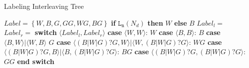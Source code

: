 \documentclass[runningheads]{llncs}
\newcommand{\pair}[1]{{\langle{#1}\rangle}}
\newcommand{\set}[1]{\left\{{#1}\right\}}
\begin{document}
\begin{algorithm}[ht]
\small
    \centering
    \caption{Labeling Interleaving Tree}\label{algo:labelinttree}
    \begin{algorithmic}[1]
        \State $\mathit{Label} = \set{W, B, G, GG, WG, BG}$
                \State \textbf{if} {$\mathtt{L_n}(N_d)$} \textbf{then} \Return $\mathit{W}$
                \State \textbf{else} \Return $\mathit{B}$
                \State \Return {}
                \State \Return {}
            \Else
                \State $\mathit{Label_l} = $ 
                \State $\mathit{Label_r} = $ 
                \State \textbf{switch} {$\pair{\mathit{Label_l},\mathit{Label_r}}$}
                    \State \quad \textbf{case} {$\pair{\mathit{W,W}}$}:
                    \State \quad\quad\Return $\mathit{W}$
                    \State \quad\textbf{case} {$\pair{\mathit{B,B}}$}:
                    \State \quad\quad\Return $\mathit{B}$
                    \State \quad\textbf{case} {$\pair{\mathit{B,W}} | \pair{\mathit{W,B}}$}
                    \State \quad\quad\Return $\mathit{G}$
                    \State \quad\textbf{case} {$\pair{\mathit{(B|W|G)?G,W}} | \pair{\mathit{W,(B|W|G)?G}} $}: \State \quad\quad\Return $\mathit{WG}$
                    \State \quad\textbf{case} {$\pair{\mathit{(B|W|G)?G,B}} | \pair{\mathit{B,(B|W|G)?G}} $}: \State \quad\quad\Return $\mathit{BG}$
                    \State \quad\textbf{case} {$\pair{\mathit{(B|W|G)?G,(B|W|G)?G}}$}:
                    \State \quad\quad\Return $\mathit{GG}$
                \State \textbf{end switch}
            \EndIf
        \EndFunction
    \end{algorithmic}

\end{algorithm}
\end{document}
